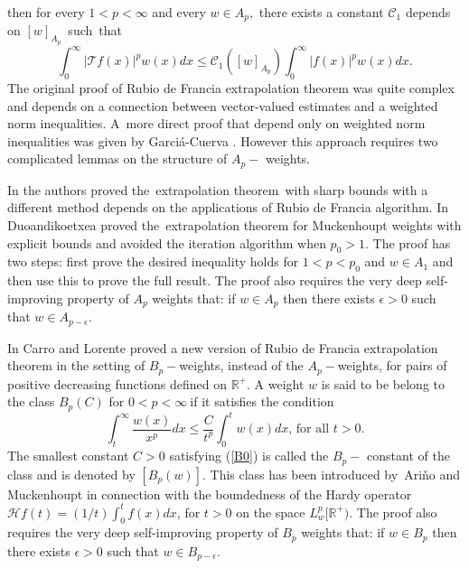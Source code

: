 \documentclass[a4paper]{amsart}
\theoremstyle{plain}
\numberwithin{equation}{section}
\begin{document}
then for every $1<p<\infty $ and every $w\in A_{p},$ there exists a constant 
$\mathcal{C}_{1}$ depends on $[w]_{A_{p}}$\ such\ that%
\begin{equation*}
\int_{0}^{\infty }\left\vert \mathcal{T}f(x)\right\vert ^{p}w(x)dx\leq 
\mathcal{C}_{1}([w]_{A_{p}})\int_{0}^{\infty }\left\vert f(x)\right\vert
^{p}w(x)dx.
\end{equation*}%
The original proof of Rubio de Francia extrapolation theorem was quite
complex and depends on a connection between vector-valued estimates and a
weighted norm inequalities. A\ more direct proof that depend only on
weighted norm inequalities was given by Garci\'{a}-Cuerva \cite{10a}.
However this approach requires two complicated lemmas on the structure of $%
A_{p}-$ weights.

\bigskip

In \cite{extrapolation} the authors proved the\ extrapolation theorem\ with
sharp bounds with a different method depends on the applications of Rubio de
Francia algorithm. In \cite{ext11} Duoandikoetxea proved the\ extrapolation
theorem for Muckenhoupt weights with explicit bounds and avoided the
iteration algorithm when $p_{0}>1.$ The proof has two steps: first prove the
desired inequality holds for $1<p<p_{0}$ and $w\in A_{1}$ and then use this
to prove the full result. The proof also requires the very deep
self-improving property of $A_{p}$ weights that: if $w\in A_{p}$ then there
exists $\epsilon >0$ such that $w\in A_{p-\epsilon }.$

\bigskip

In \cite{Carro} Carro and Lorente proved a new version of Rubio de Francia
extrapolation theorem in the setting of $B_{p}-$weights, instead of the $%
A_{p}-$weights, for pairs of positive decreasing functions defined on $%
\mathbb{R}^{+}$. A weight $w$ is said to be belong to the class $B_{p}(C)$
for $0<p<\infty \ $if it satisfies the condition 
\begin{equation}
\int_{t}^{\infty }\frac{w(x)}{x^{p}}dx\leq \frac{C}{t^{p}}\int_{0}^{t}w(x)dx%
\text{, \ for all }t>0.  \label{B0}
\end{equation}%
The smallest constant $C>0$ satisfying (\ref{B0}) is called the $B_{p}-$%
constant of the class and is denoted by $\left[ B_{p}(w)\right] $. This
class has been introduced by\ Ari\v{n}o and Muckenhoupt \cite{Arino} in
connection with the boundedness of the Hardy operator $\mathcal{H}%
f(t)=(1/t)\int_{0}^{t}f(x)dx$, for $t>0$ on the space $L_{w}^{p}[\mathbb{R}%
^{+}).$ The proof also requires the very deep self-improving property of $%
B_{p}$ weights that: if $w\in B_{p}$ then there exists $\epsilon >0$ such
that $w\in B_{p-\epsilon }.$
\end{document}
